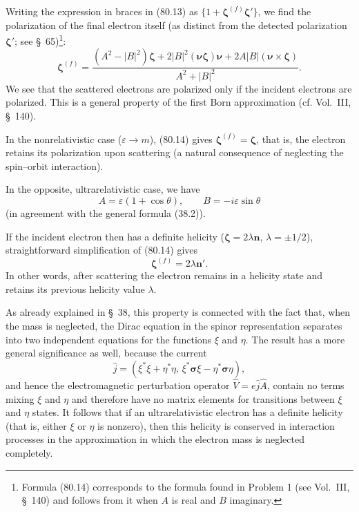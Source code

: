 Writing the expression in braces in (80.13) as $\{1+\boldsymbol\zeta^{(f)}\boldsymbol\zeta'\}$, we find the polarization of the final electron itself (as distinct from the detected polarization $\boldsymbol\zeta'$; see \S~65)\footnote{Formula (80.14) corresponds to the formula found in Problem 1 (see Vol.~III, \S~140) and follows from it when $A$ is real and $B$ imaginary.}:
\begin{equation}
\boldsymbol\zeta^{(f)}
=\frac{(A^2-|B|^2)\boldsymbol\zeta
+2|B|^2(\boldsymbol\nu\boldsymbol\zeta)\boldsymbol\nu
+2A|B|(\boldsymbol\nu\times\boldsymbol\zeta)}
{A^2+|B|^2}.
\tag{80.14}
\end{equation}
We see that the scattered electrons are polarized only if the incident electrons are polarized. This is a general property of the first Born approximation (cf. Vol.~III, \S~140).

In the nonrelativistic case ($\varepsilon\to m$), (80.14) gives $\boldsymbol\zeta^{(f)}=\boldsymbol\zeta$, that is, the electron retains its polarization upon scattering (a natural consequence of neglecting the spin--orbit interaction).

In the opposite, ultrarelativistic case, we have
\[
A=\varepsilon(1+\cos\theta),
\qquad
B=-i\varepsilon\sin\theta
\]
(in agreement with the general formula (38.2)).

If the incident electron then has a definite helicity ($\boldsymbol\zeta=2\lambda\mathbf n$, $\lambda=\pm1/2$), straightforward simplification of (80.14) gives
\[
\boldsymbol\zeta^{(f)}=2\lambda\mathbf n'.
\]
In other words, after scattering the electron remains in a helicity state and retains its previous helicity value $\lambda$.

As already explained in \S~38, this property is connected with the fact that, when the mass is neglected, the Dirac equation in the spinor representation separates into two independent equations for the functions $\xi$ and $\eta$. The result has a more general significance as well, because the current
\[
\widehat j=(\xi^*\xi+\eta^*\eta,\,
\xi^*\boldsymbol\sigma\xi-\eta^*\boldsymbol\sigma\eta),
\]
and hence the electromagnetic perturbation operator $\widehat V=e\widehat j\widehat A$, contain no terms mixing $\xi$ and $\eta$ and therefore have no matrix elements for transitions between $\xi$ and $\eta$ states. It follows that if an ultrarelativistic electron has a definite helicity (that is, either $\xi$ or $\eta$ is nonzero), then this helicity is conserved in interaction processes in the approximation in which the electron mass is neglected completely.
